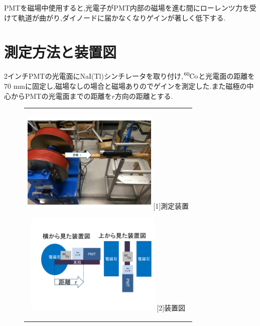 PMTを磁場中使用すると,光電子がPMT内部の磁場を進む間にローレンツ力を受けて軌道が曲がり,ダイノードに届かなくなりゲインが著しく低下する.


\section{測定方法と装置図}
2インチPMTの光電面にNaI(Tl)シンチレータを取り付け,$\ce{^{60}Co}$と光電面の距離を70 mmに固定し,磁場なしの場合と磁場ありのでゲインを測定した.また磁極の中心からPMTの光電面までの距離を$r$方向の距離とする.
 
\begin{figure}[h]
  \begin{center}
    \begin{tabular}{c}
      \begin{minipage}[h]{0.5\hsize}    
        \begin{center}
          \includegraphics[width=6.5cm]{fig/iguchi/2inchsokutei.pdf}
	\hspace{2cm}[1]測定装置
     \end{center}
    \end{minipage}
      \begin{minipage}[h]{0.5\hsize}    
        \begin{center}
          \includegraphics[width=6.5cm]{fig/iguchi/soutizu1.pdf}
         \hspace{2cm}[2]装置図
         \end{center}
        \end{minipage}
     
     \end{tabular}
     \label{souchi}
    \end{center}
 \end{figure}

